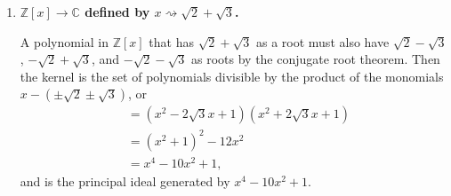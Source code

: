 \documentclass[a4paper,12pt]{article}
\begin{document}
\begin{enumerate}
\begin{enumerate}
              \item
                \boldmath
                \textbf{$\mathbb{Z}[x] \to \mathbb{C}$ defined by $x \rightsquigarrow \sqrt{2} + \sqrt{3}$.} \par
                \unboldmath
                A polynomial in $\mathbb{Z}[x]$ that has $\sqrt{2} + \sqrt{3}$ as a root must also have $\sqrt{2} - \sqrt{3}$, $-\sqrt{2} + \sqrt{3}$, and $-\sqrt{2} - \sqrt{3}$ as roots by the conjugate root theorem. Then the kernel is the set of polynomials divisible by the product of the monomials $x - (\pm \sqrt{2} \pm \sqrt{3})$, or
                \begin{align*}
                    [(x - \sqrt{3})^2 - 2] [(x + \sqrt{3})^2 - 2] &= (x^2 - 2\sqrt{3}x + 1)(x^2 + 2\sqrt{3}x + 1) \\
                    &= (x^2 + 1)^2 - 12x^2 \\
                    &= x^4 - 10x^2 + 1,
                \end{align*}
                and is the principal ideal generated by $x^4 - 10x^2 + 1$.


\end{enumerate}
\end{enumerate}
\end{document}
